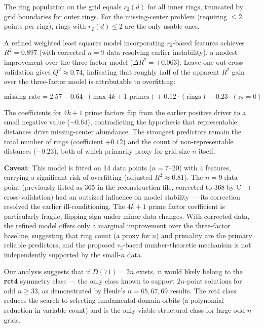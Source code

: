 \documentclass[11pt,a4paper]{article}
\theoremstyle{plain}
\theoremstyle{definition}
\begin{document}
The ring population on the grid equals $r_2(d)$ for all inner rings, truncated by grid boundaries for outer rings. For the missing-center problem (requiring $\le 2$ points per ring), rings with $r_2(d) \le 2$ are the only usable ones.

A refined weighted least squares model incorporating $r_2$-based features achieves $R^2 = 0.897$ (with corrected $n=9$ data resolving earlier instability), a modest improvement over the three-factor model ($\Delta R^2 = +0.063$). Leave-one-out cross-validation gives $Q^2 \approx 0.74$, indicating that roughly half of the apparent $R^2$ gain over the three-factor model is attributable to overfitting:

\[
\text{missing rate} = 2.57 - 0.64\cdot(\text{max }4k+1\text{ primes}) + 0.12\cdot(\text{rings}) - 0.23\cdot(\text{r}_2=0)
\]

The coefficients for $4k+1$ prime factors flip from the earlier positive driver to a small negative value ($-0.64$), contradicting the hypothesis that representable distances drive missing-center abundance. The strongest predictors remain the total number of rings (coefficient $+0.12$) and the count of non-representable distances ($-0.23$), both of which primarily proxy for grid size $n$ itself.

\textbf{Caveat}: This model is fitted on 14 data points ($n=7$--$20$) with 4 features, carrying a significant risk of overfitting (adjusted $R^2 \approx 0.81$). The $n=9$ data point (previously listed as 365 in the reconstruction file, corrected to 368 by C++ cross-validation) had an outsized influence on model stability --- its correction resolved the earlier ill-conditioning. The $4k+1$ prime factor coefficient is particularly fragile, flipping sign under minor data changes. With corrected data, the refined model offers only a marginal improvement over the three-factor baseline, suggesting that ring count (a proxy for $n$) and primality are the primary reliable predictors, and the proposed $r_2$-based number-theoretic mechanism is not independently supported by the small-$n$ data.

Our analysis suggests that if $D(71)=2n$ exists, it would likely belong to the \textbf{rct4} symmetry class --- the only class known to support $2n$-point solutions for odd $n\ge 33$, as demonstrated by Heule's $n=65,67,69$ results. The rct4 class reduces the search to selecting fundamental-domain orbits (a polynomial reduction in variable count) and is the only viable structural class for large odd-$n$ grids.
\end{document}
